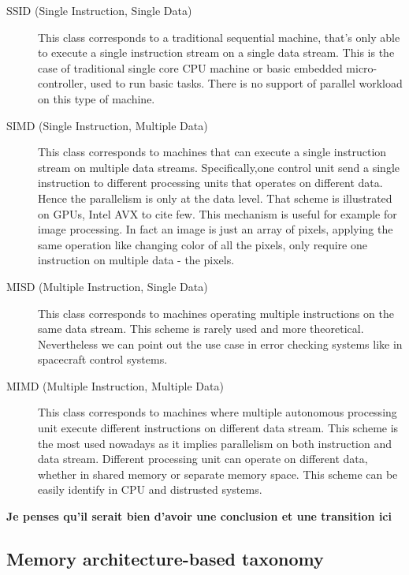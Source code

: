 \begin{description}

\item[SSID (Single Instruction, Single Data)] This class corresponds to a traditional sequential machine, that’s only able to execute a single instruction stream on a single data stream. This is the case of traditional single core CPU machine or basic embedded micro-controller, used to run basic tasks. There is no support of parallel workload on this type of machine. 

\item[SIMD (Single Instruction, Multiple Data)] This class corresponds to machines that can execute a single instruction stream on multiple data streams. Specifically,one control unit send a single instruction to different processing units that operates on different data. Hence the parallelism is only at the data level. That scheme is illustrated on GPUs, Intel AVX to cite few. This mechanism is useful for example for image processing. In fact an image is just an array of pixels, applying the same operation like changing color of all the pixels, only require one instruction on multiple data - the pixels.

\item[MISD (Multiple Instruction, Single Data)] This class corresponds to machines operating multiple instructions on the same data stream. This scheme is rarely used and more theoretical. Nevertheless we can point out the use case in error checking systems like in spacecraft control systems.

\item[MIMD (Multiple Instruction, Multiple Data)] This class corresponds to machines where multiple autonomous processing unit execute different instructions on different data stream. This scheme is the most used nowadays as it implies parallelism on both instruction and data stream. Different processing unit can operate on different data, whether in shared memory or separate memory space. This scheme can be easily identify in CPU and distrusted systems. 

\end{description}


\textbf{Je penses qu'il serait bien d'avoir une conclusion et une transition ici}

\subsection{Memory architecture-based taxonomy}

